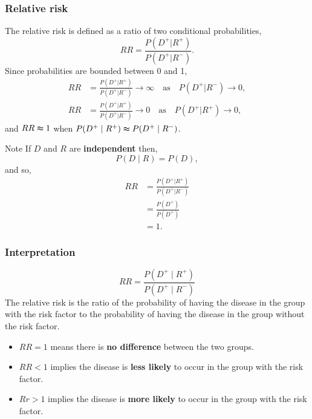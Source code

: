 \documentclass[a4paper]{article}
\begin{document}
\subsubsection{Relative risk}
The relative risk is defined as a ratio of two conditional probabilities,
\[
	RR = \frac{P(D^+|R^+)}{P(D^+|R^-)}.
\]
Since probabilities are bounded between 0 and 1,
\begin{align*}
	RR &= \frac{P(D^+|R^+)}{P(D^+|R^-)} \to \infty \quad \text{as} \quad P(D^+|R^-) \to 0,\\
	RR &= \frac{P(D^+|R^+)}{P(D^+|R^-)} \to 0 \quad \text{as} \quad P(D^+|R^+) \to 0,
\end{align*}
and \( RR \thickapprox 1 \) when \( P(D^+ \mid R^+) \thickapprox P(D^+ \mid R^-) \).
\begin{bluebox}{Note}
	If \( D \) and \( R \) are \textbf{independent} then,
	\[
		P(D \mid R) = P(D),
	\]
	and so,
	\begin{align*}
		RR & = \frac{P(D^+|R^+)}{P(D^+|R^-)} \\
		& = \frac{P(D^+)}{P(D^+)} \\
		& = 1.
		\end{align*}
	\end{bluebox}
\subsubsection{Interpretation}
\[
	RR = \frac{P(D^+ \mid R^+)}{P(D^+ \mid R^-)}
\]
The relative risk is the ratio of the probability of having the disease in the group with the risk factor to the probability of having the disease in the group without the risk factor.
\begin{itemize}
	\item \( RR = 1 \) means there is \textbf{no difference} between the two groups.
	\item \( RR < 1 \) implies the disease is \textbf{less likely} to occur in the group with the risk factor.
	\item \( Rr > 1 \) implies the disease is \textbf{more likely} to occur in the group with the risk factor.
\end{itemize}
\end{document}

